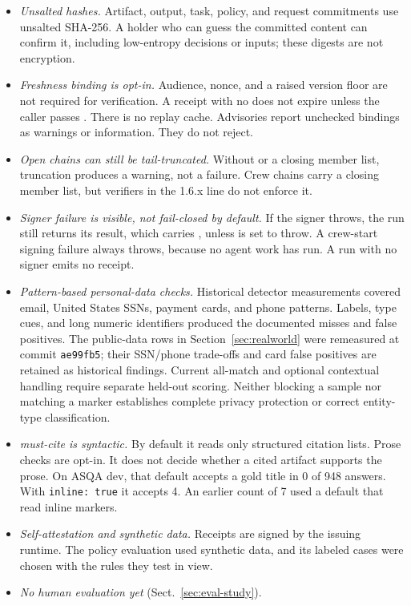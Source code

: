 \begin{itemize}
\item \emph{Unsalted hashes.} Artifact, output, task, policy, and request commitments use unsalted SHA-256. A holder who can guess the committed content can confirm it, including low-entropy decisions or inputs; these digests are not encryption.
\item \emph{Freshness binding is opt-in.} Audience, nonce, and a raised version floor are not required for verification. A receipt with no  does not expire unless the caller passes . There is no replay cache. Advisories report unchecked bindings as warnings or information. They do not reject.
\item \emph{Open chains can still be tail-truncated.} Without  or a closing member list, truncation produces a warning, not a failure. Crew chains carry a closing member list, but verifiers in the 1.6.x line do not enforce it.
\item \emph{Signer failure is visible, not fail-closed by default.} If the signer throws, the run still returns its result, which carries , unless  is set to throw. A crew-start signing failure always throws, because no agent work has run. A run with no signer emits no receipt.
\item \emph{Pattern-based personal-data checks.} Historical detector measurements covered email, United States SSNs, payment cards, and phone patterns. Labels, type cues, and long numeric identifiers produced the documented misses and false positives. The public-data rows in Section~\ref{sec:realworld} were remeasured at commit \texttt{ae99fb5}; their SSN/phone trade-offs and card false positives are retained as historical findings. Current all-match and optional contextual handling require separate held-out scoring. Neither blocking a sample nor matching a marker establishes complete privacy protection or correct entity-type classification.
\item \emph{must-cite is syntactic.} By default it reads only structured citation lists. Prose checks are opt-in. It does not decide whether a cited artifact supports the prose. On ASQA dev, that default accepts a gold title in 0 of 948 answers. With \texttt{inline:~true} it accepts 4. An earlier count of 7 used a default that read inline markers.
\item \emph{Self-attestation and synthetic data.} Receipts are signed by the issuing runtime. The policy evaluation used synthetic data, and its labeled cases were chosen with the rules they test in view.
\item \emph{No human evaluation yet} (Sect.~\ref{sec:eval-study}).
\end{itemize}

